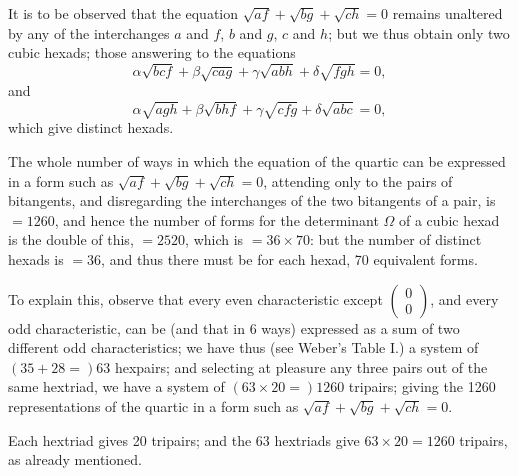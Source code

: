 \documentclass[11pt,a4paper]{article}
\begin{document}
It is to be observed that the equation $\sqrt{af} + \sqrt{bg} + \sqrt{ch} = 0$ remains unaltered by any of the interchanges $a$ and $f$, $b$ and $g$, $c$ and $h$; but we thus obtain only two cubic hexads; those answering to the equations
\[
\alpha\sqrt{bcf} + \beta\sqrt{cag} + \gamma\sqrt{abh} + \delta\sqrt{fgh} = 0,
\]
and
\[
\alpha\sqrt{agh} + \beta\sqrt{bhf} + \gamma\sqrt{cfg} + \delta\sqrt{abc} = 0,
\]
which give distinct hexads.

The whole number of ways in which the equation of the quartic can be expressed in a form such as $\sqrt{af} + \sqrt{bg} + \sqrt{ch} = 0$, attending only to the pairs of bitangents, and disregarding the interchanges of the two bitangents of a pair, is $= 1260$, and hence the number of forms for the determinant $\Omega$ of a cubic hexad is the double of this, $= 2520$, which is $= 36 \times 70$: but the number of distinct hexads is $= 36$, and thus there must be for each hexad, 70 equivalent forms.

To explain this, observe that every even characteristic except $\begin{pmatrix} 0 \\ 0 \end{pmatrix}$, and every odd characteristic, can be (and that in 6 ways) expressed as a sum of two different odd characteristics; we have thus (see Weber's Table I.) a system of $(35 + 28 =) 63$ hexpairs; and selecting at pleasure any three pairs out of the same hextriad, we have a system of $(63 \times 20 =) 1260$ tripairs; giving the 1260 representations of the quartic in a form such as $\sqrt{af} + \sqrt{bg} + \sqrt{ch} = 0$.

Each hextriad gives 20 tripairs; and the 63 hextriads give $63 \times 20 = 1260$ tripairs, as already mentioned.
\end{document}
